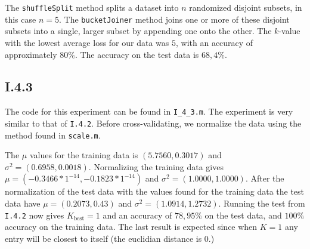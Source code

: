 The \texttt{shuffleSplit} method splits a dataset into $n$ randomized disjoint
subsets, in this case $n = 5$. The \texttt{bucketJoiner} method joins one or
more of these disjoint subsets into a single, larger subset by appending one
onto the other. The $k$-value with the lowest average loss for our data was
$5$, with an accuracy of approximately $80\%$. The accuracy on the test data is
$68,4\%$.

\subsection{I.4.3}
The code for this experiment can be found in \texttt{I\_4\_3.m}. The experiment
is very similar to that of \texttt{I.4.2}. Before cross-validating, we normalize
the data using the method found in \texttt{scale.m}.

The $\mu$ values for the training data is $(5.7560, 0.3017)$ and $\sigma^2 =
(0.6958, 0.0018)$. Normalizing the training data gives $\mu = (-0.3466*1^{-14},
-0.1823*1^{-14})$ and $\sigma^2 = (1.0000, 1.0000)$. After the normalization of
the test data with the values found for the training data the test data have
$\mu = (0.2073, 0.43)$ and $\sigma^2 = (1.0914, 1.2732)$. Running the test from
\texttt{I.4.2} now gives $K_{\text{best}}=1$ and an accuracy of $78,95\%$ on the
test data, and $100\%$ accuracy on the training data. The last result is
expected since when $K=1$ any entry will be closest to itself (the euclidian
distance is 0.)

